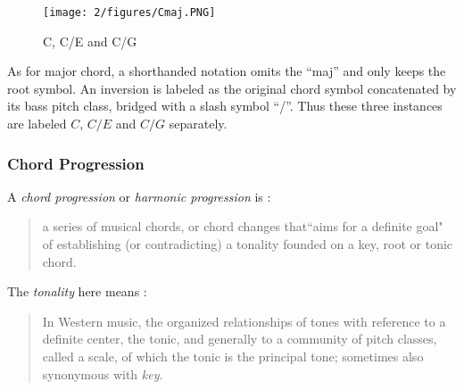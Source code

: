 \begin{figure}[htb]
\centering
\texttt{[image: 2/figures/Cmaj.PNG]}
\caption{C, C/E and C/G}
\label{fig:2-cmaj}
\end{figure}

As for major chord, a shorthanded notation omits the ``maj'' and only keeps the root symbol. An inversion is labeled as the original chord symbol concatenated by its bass pitch class, bridged with a slash symbol ``/''. Thus these three instances are labeled $C$, $C/E$ and $C/G$ separately.

\subsubsection{Chord Progression}
A {\it chord progression} or {\it harmonic progression} is \cite{schonberg1989structural}:
\begin{quote}
a series of musical chords, or chord changes that``aims for a definite goal" of establishing (or contradicting) a tonality founded on a key, root or tonic chord.
\end{quote}
The {\it tonality} here means \cite{randel1999harvard}:
\begin{quote}
In Western music, the organized relationships of tones with reference to a definite center, the tonic, and generally to a community of pitch classes, called a scale, of which the tonic is the principal tone; sometimes also synonymous with {\it key}.
\end{quote}

